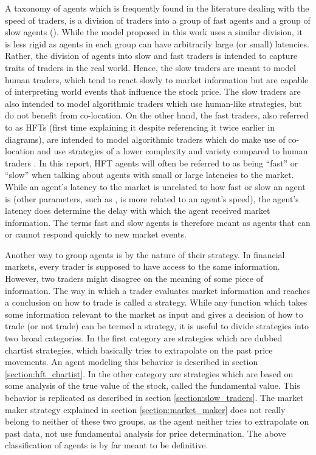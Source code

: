 A taxonomy of agents which is frequently found in the literature dealing with the speed of traders, is a division of traders into a group of fast agents and a group of slow agents (\cite{foucault2012news, hoffmann2012dynamic, mcinish2012strategic}). While the model proposed in this work uses a similar division, it is less rigid as agents in each group can have arbitrarily large (or small) latencies. Rather, the division of agents into slow and fast traders is intended to capture traits of traders in the real world. Hence, the slow traders are meant to model human traders, which tend to react slowly to market information but are capable of interpreting world events that influence the stock price. The slow traders are also intended to model algorithmic traders which use human-like strategies, but do not benefit from co-location. On the other hand, the fast traders, also referred to as HFTs (first time explaining it despite referencing it twice earlier in diagrams), are intended to model algorithmic traders which do make use of co-location \cite{brogaard2013trading} and use strategies of a lower complexity and variety compared to human traders \cite{chaboud2009rise}.  In this report, HFT agents will often be referred to as being ``fast'' or ``slow'' when talking about agents with small or large latencies to the market. While an agent's latency to the market is unrelated to how fast or slow an agent is (other parameters, such as ,  is more related to an agent's speed), the agent's latency does determine the delay with which the agent received market information. The terms fast and slow agents is therefore meant as agents that can or cannot respond quickly to new market events.

Another way to group agents is by the nature of their strategy. In financial markets, every trader is supposed to have access to the same information. However, two traders might disagree on the meaning of some piece of information. The way in which a trader evaluates market information and reaches a conclusion on how to trade is called a strategy. While any function which takes some information relevant to the market as input and gives a decision of how to trade (or not trade) can be termed a strategy, it is useful to divide strategies into two broad categories. In the first category are strategies which are dubbed chartist strategies, which basically tries to extrapolate on the past price movements. An agent modeling this behavior is described in section \ref{section:hft_chartist}. In the other category are strategies which are based on some analysis of the true value of the stock, called the fundamental value. This behavior is replicated as described in section \ref{section:slow_traders}. The market maker strategy explained in section \ref{section:market_maker} does not really belong to neither of these two groups, as the agent neither tries to extrapolate on past data, not use fundamental analysis for price determination. The above classification of agents is by far meant to be definitive. 






